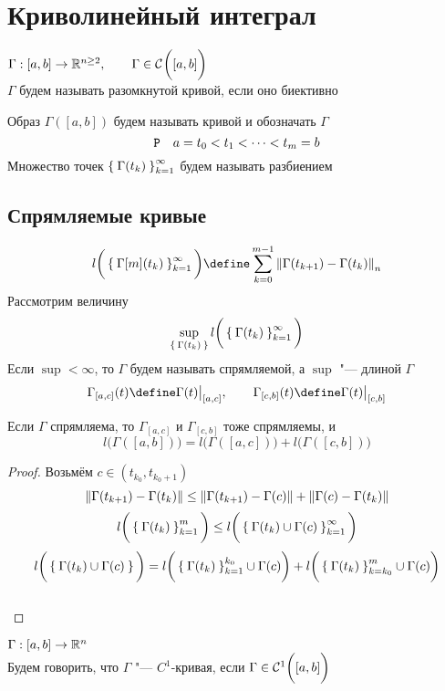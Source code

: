 \chapter{Криволинейный интеграл}

\begin{definition}
	$ \Gamma : [a, b] \to \R^{n \ge 2}, \qquad \Gamma \in \Cont{[a, b]} $ \\
	$ \Gamma $ будем называть разомкнутой кривой, если оно биективно
\end{definition}

Образ $ \Gamma([a, b]) $ будем называть кривой и обозначать $ \Gamma $
$$ \Par \quad a = t_0 < t_1 < \dots < t_m = b $$
Множество точек $ \seq{\Gamma(t_k)}k $ будем называть разбиением

\section{Спрямляемые кривые}

$$ l \bigg( \seq{\Gamma[m](t_k)}k \bigg) \define \sum_{k = 0}^{m - 1} \norm{\Gamma(t_{k + 1}) - \Gamma(t_k)}_n $$
Рассмотрим величину
$$ \sup\limits_{\set{\Gamma(t_k)}} l \bigg( \seq{\Gamma(t_k)}k \bigg) $$
Если $ \sup < \infty $, то $ \Gamma $ будем называть спрямляемой, а $ \sup $ "--- длиной $ \Gamma $
$$ \Gamma_{[a, c]}(t) \define \Gamma(t)\clamp{[a, c]}, \qquad \Gamma_{[c, b]} (t) \define \Gamma(t)\clamp{[c, b]} $$

\begin{statement}
	Если $ \Gamma $ спрямляема, то $ \Gamma_{[a, c]} $ и $ \Gamma_{[c, b]} $ тоже спрямляемы, и
	$$ l \bigg( \Gamma([a, b]) \bigg) = l \bigg( \Gamma([a, c]) \bigg) + l \bigg( \Gamma([c, b]) \bigg) $$
\end{statement}

\begin{proof}
	Возьмём $ c \in (t_{k_0}, t_{k_0 + 1}) $
	$$ \norm{\Gamma(t_{k + 1}) - \Gamma(t_k)} \le \norm{\Gamma(t_{k + 1}) - \Gamma(c)} + \norm{\Gamma(c) - \Gamma(t_k)} $$
	$$ l \bigg( \seq[m]{\Gamma(t_k)}k \bigg) \le l \bigg( \seq{\Gamma(t_k) \cup \Gamma(c)}k \bigg) $$
	$$ l \bigg( \set{\Gamma(t_k) \cup \Gamma(c)} \bigg) = l \bigg( \seq[k_0]{\Gamma(t_k)}k \cup \Gamma(c) \bigg) + l \bigg( \seqv[m]{\Gamma(t_k)}k{k_0} \cup \Gamma(c) \bigg) $$
	\widedots[10cm] \\
\end{proof}

\begin{definition}
	$ \Gamma : [a, b] \to \R^n $ \\
	Будем говорить, что $ \Gamma $ "--- $ C^1 $-кривая, если $ \Gamma \in \Cont[1]{[a, b]} $
\end{definition}

